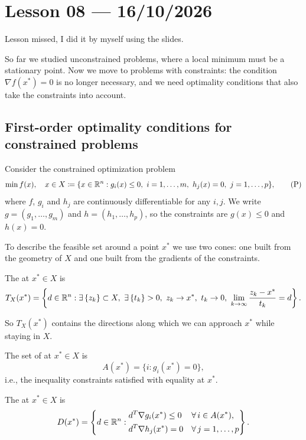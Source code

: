 \section{Lesson 08 --- 16/10/2026}
Lesson missed, I did it by myself using the slides.

So far we studied unconstrained problems, where a local minimum must be a stationary point. Now we move to problems with constraints: the condition $\nabla f(x^*) = 0$ is no longer necessary, and we need optimality conditions that also take the constraints into account.

\subsection{First-order optimality conditions for constrained problems}

Consider the constrained optimization problem
\[
    \min f(x), \quad x \in X \coloneqq \{x \in \mathbb{R}^n : g_i(x) \le 0,\ i = 1, \dots, m,\ h_j(x) = 0,\ j = 1, \dots, p\}, \tag{P}
\]
where $f$, $g_i$ and $h_j$ are continuously differentiable for any $i, j$. We write $g = (g_1, \dots, g_m)$ and $h = (h_1, \dots, h_p)$, so the constraints are $g(x) \le 0$ and $h(x) = 0$.

To describe the feasible set around a point $x^*$ we use two cones: one built from the geometry of $X$ and one built from the gradients of the constraints.

\begin{definition}
    The  at $x^* \in X$ is
    \[
        T_X(x^*) = \left\{ d \in \R^n : \exists\, \{z_k\} \subset X,\ \exists\, \{t_k\} > 0,\ z_k \to x^*,\ t_k \to 0,\ \lim_{k \to \infty} \frac{z_k - x^*}{t_k} = d \right\}.
    \]
\end{definition}

So $T_X(x^*)$ contains the directions along which we can approach $x^*$ while staying in $X$.

\begin{definition}
    The set of  at $x^* \in X$ is
    \[
        A(x^*) = \{i : g_i(x^*) = 0\},
    \]
    i.e., the inequality constraints satisfied with equality at $x^*$.
\end{definition}

\begin{definition}
    The  at $x^* \in X$ is
    \[
        D(x^*) = \left\{ d \in \mathbb{R}^n :
        \begin{aligned}
            & d^T\nabla g_i(x^*) \le 0 && \forall\, i \in A(x^*),\\
            & d^T\nabla h_j(x^*) = 0 && \forall\, j = 1, \dots, p
        \end{aligned}
        \right\}.
    \]
\end{definition}

